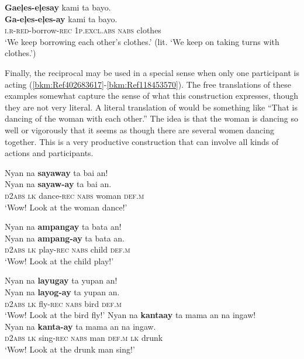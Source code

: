 \ea
\textbf{Gaeļes-eļesay}  kami  ta  bayo. \\\smallskip
\gll \textbf{Ga-eļes-eļes-ay}  kami  ta  bayo. \\
\textsc{i.r-red}-borrow-\textsc{rec}  1\textsc{p.excl.abs}  \textsc{nabs}  clothes \\
\glt ‘We keep borrowing each other’s clothes.’ (lit. ‘We keep on taking turns with clothes.’)
\z

Finally, the reciprocal may be used in a special sense when only one participant is acting (\ref{bkm:Ref402683617}-\ref{bkm:Ref118453570}). The free translations of these examples somewhat capture the sense of what this construction expresses, though they are not very literal. A literal translation of  would be something like “That is dancing of the woman with each other.” The idea is that the woman is dancing so well or vigorously that it seems as though there are several women dancing together. This is a very productive construction that can involve all kinds of actions and participants.

\ea
\label{bkm:Ref402683617}
Nyan  na  \textbf{sayaway}  ta  bai  an! \\\smallskip
\gll Nyan  na  \textbf{sayaw-ay}  ta  bai  an. \\
\textsc{d2abs}  \textsc{lk}  dance-\textsc{rec}  \textsc{nabs}  woman  \textsc{def.m} \\
\glt ‘Wow! Look at the woman dance!’
\z

\ea
Nyan  na  \textbf{ampangay}  ta  bata  an! \\\smallskip
\gll Nyan  na  \textbf{ampang-ay}  ta  bata  an. \\
\textsc{d2abs}  \textsc{lk}  play-\textsc{rec}  \textsc{nabs}  child  \textsc{def.m} \\
\glt ‘Wow! Look at the child play!’
\z

\ea
Nyan  na  \textbf{layugay}  ta  yupan  an! \\\smallskip
\gll Nyan  na  \textbf{layog-ay}  ta  yupan  an. \\
\textsc{d2abs}  \textsc{lk}  fly-\textsc{rec}  \textsc{nabs}  bird  \textsc{def.m} \\
\glt ‘Wow! Look at the bird fly!’
\z
\ea
Nyan  na  \textbf{kantaay}  ta  mama an na  ingaw! \\\smallskip
\gll Nyan  na  \textbf{kanta-ay}  ta  mama an na ingaw. \\
\textsc{d2abs}  \textsc{lk}  sing-\textsc{rec}  \textsc{nabs} man \textsc{def.m} \textsc{lk} drunk \\
\glt ‘Wow! Look at the drunk man sing!’
\z

